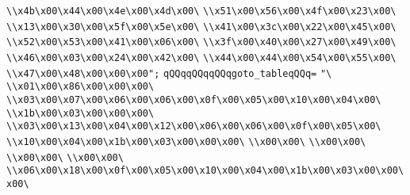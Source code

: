 \verb|\\x4b\x00\x44\x00\x4e\x00\x4d\x00\|\newline
\verb|\\x51\x00\x56\x00\x4f\x00\x23\x00\|\newline
\verb|\\x13\x00\x30\x00\x5f\x00\x5e\x00\|\newline
\verb|\\x41\x00\x3c\x00\x22\x00\x45\x00\|\newline
\verb|\\x52\x00\x53\x00\x41\x00\x06\x00\|\newline
\verb|\\x3f\x00\x40\x00\x27\x00\x49\x00\|\newline
\verb|\\x46\x00\x03\x00\x24\x00\x42\x00\|\newline
\verb|\\x44\x00\x44\x00\x54\x00\x55\x00\|\newline
\verb|\\x47\x00\x48\x00\x00\x00";|\newline
\verb|qQQqqQQqqQQqgoto_tableqQQq=|\newline
\verb|"\|\newline
\verb|\\x01\x00\x86\x00\x00\x00\|\newline
\verb|\\x03\x00\x07\x00\x06\x00\x06\x00\x0f\x00\x05\x00\x10\x00\x04\x00\|\newline
\verb|\\x1b\x00\x03\x00\x00\x00\|\newline
\verb|\\x03\x00\x13\x00\x04\x00\x12\x00\x06\x00\x06\x00\x0f\x00\x05\x00\|\newline
\verb|\\x10\x00\x04\x00\x1b\x00\x03\x00\x00\x00\|\newline
\verb|\\x00\x00\|\newline
\verb|\\x00\x00\|\newline
\verb|\\x00\x00\|\newline
\verb|\\x00\x00\|\newline
\verb|\\x06\x00\x18\x00\x0f\x00\x05\x00\x10\x00\x04\x00\x1b\x00\x03\x00\x00\x00\|\newline
